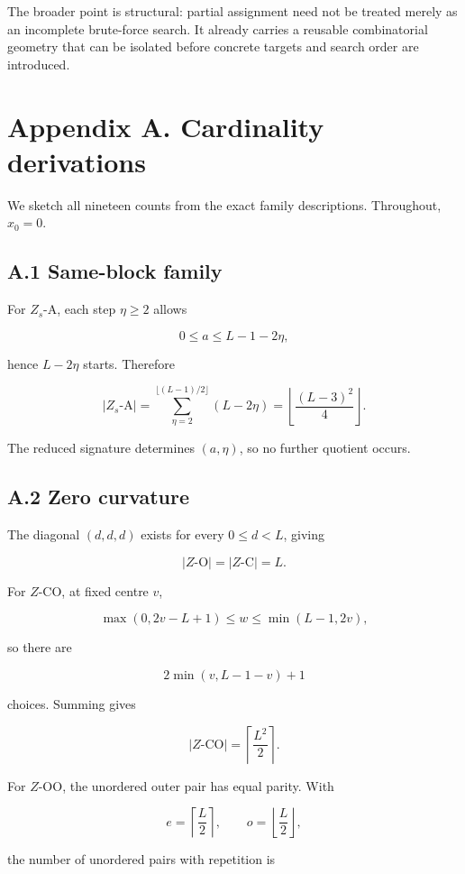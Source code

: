 \documentclass[
  british,
  a4paper,
  11pt]{article}
\begin{document}
The broader point is structural: partial assignment need not be treated
merely as an incomplete brute-force search. It already carries a
reusable combinatorial geometry that can be isolated before concrete
targets and search order are introduced.

\section{Appendix A. Cardinality
derivations}\label{appendix-a.-cardinality-derivations}

We sketch all nineteen counts from the exact family descriptions.
Throughout, \(x_0=0\).

\subsection{A.1 Same-block family}\label{a.1-same-block-family}

For \(Z_s\)-A, each step \(\eta\ge2\) allows

\[
0\le a\le L-1-2\eta,
\]

hence \(L-2\eta\) starts. Therefore

\[
|Z_s\text{-A}|
=
\sum_{\eta=2}^{\lfloor(L-1)/2\rfloor}(L-2\eta)
=
\left\lfloor\frac{(L-3)^2}{4}\right\rfloor.
\]

The reduced signature determines \((a,\eta)\), so no further quotient
occurs.

\subsection{A.2 Zero curvature}\label{a.2-zero-curvature}

The diagonal \((d,d,d)\) exists for every \(0\le d<L\), giving

\[
|Z\text{-O}|=|Z\text{-C}|=L.
\]

For \(Z\)-CO, at fixed centre \(v\),

\[
\max(0,2v-L+1)\le w\le\min(L-1,2v),
\]

so there are

\[
2\min(v,L-1-v)+1
\]

choices. Summing gives

\[
|Z\text{-CO}|
=
\left\lceil\frac{L^2}{2}\right\rceil.
\]

For \(Z\)-OO, the unordered outer pair has equal parity. With

\[
e=\left\lceil\frac L2\right\rceil,
\qquad
o=\left\lfloor\frac L2\right\rfloor,
\]

the number of unordered pairs with repetition is
\end{document}
